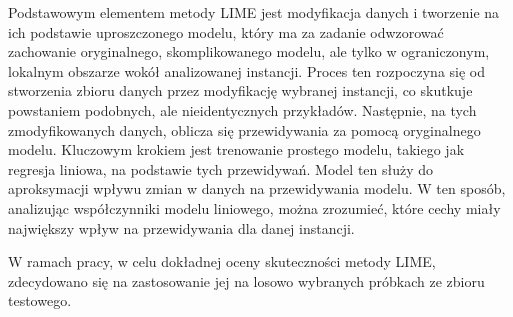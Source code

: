 \documentclass[a4paper,twoside,12pt]{book}
\begin{document}
Podstawowym elementem metody LIME jest modyfikacja danych i tworzenie na ich podstawie uproszczonego modelu, który ma za zadanie odwzorować zachowanie oryginalnego, skomplikowanego modelu, ale tylko w ograniczonym, lokalnym obszarze wokół analizowanej instancji. Proces ten rozpoczyna się od stworzenia zbioru danych przez modyfikację wybranej instancji, co skutkuje powstaniem podobnych, ale nieidentycznych przykładów. Następnie, na tych zmodyfikowanych danych, oblicza się przewidywania za pomocą oryginalnego modelu. Kluczowym krokiem jest trenowanie prostego modelu, takiego jak regresja liniowa, na podstawie tych przewidywań. Model ten służy do aproksymacji wpływu zmian w danych na przewidywania modelu. W ten sposób, analizując współczynniki modelu liniowego, można zrozumieć, które cechy miały największy wpływ na przewidywania dla danej instancji.

W ramach pracy, w celu dokładnej oceny skuteczności metody LIME, zdecydowano się na zastosowanie jej na losowo wybranych próbkach ze zbioru testowego.
\end{document}
